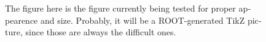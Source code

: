 

\begin{english}


\begin{figure}

\centering
\begin{minipage}{.69\textwidth}
\begin{infilsf} \tiny

\end{infilsf}
\end{minipage}
\caption{The figure here is the figure currently being tested for
  proper appearence and size. Probably, it will be a ROOT-generated
  TikZ picture, since those are always the difficult ones.}
\label{fig:my_label}
\end{figure}


\end{english}

